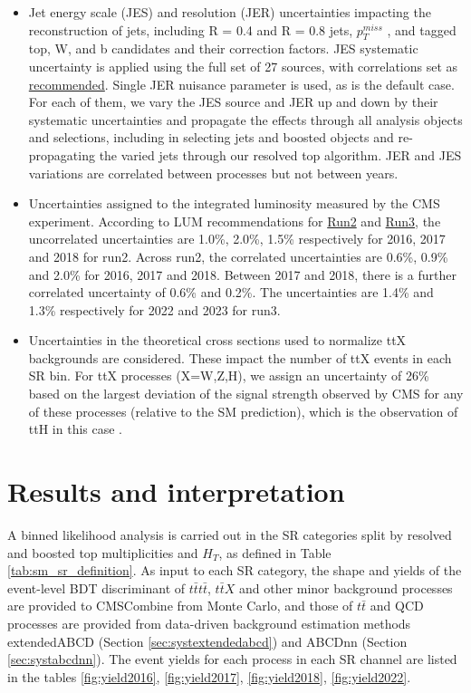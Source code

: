 \documentclass[twoside]{article}
\begin{document}
\begin{itemize}
    \item Jet energy scale (JES) and resolution (JER) uncertainties impacting the reconstruction of jets, including R = 0.4 and R = 0.8 jets, $p_T^{miss}$ , and tagged top, W, and b candidates and their correction factors. JES systematic uncertainty is applied using the full set of 27 sources, with correlations set as \href{https://cms-jerc.web.cern.ch/Recommendations/#uncertainites-and-correlations}{recommended}. Single JER nuisance parameter is used, as is the default case. For each of them, we vary the JES source and JER up and down by their systematic uncertainties and propagate the effects through all analysis objects and selections, including in selecting jets and boosted objects and re-propagating the varied jets through our resolved top algorithm. JER and JES variations are correlated between processes but not between years.
    \item Uncertainties assigned to the integrated luminosity measured by the CMS experiment. According to LUM recommendations for \href{https://twiki.cern.ch/twiki/bin/view/CMS/LumiRecommendationsRun2#Combination_and_correlations}{Run2} and \href{https://twiki.cern.ch/twiki/bin/view/CMS/LumiRecommendationsRun3}{Run3}, the uncorrelated uncertainties are 1.0\%, 2.0\%, 1.5\% respectively for 2016, 2017 and 2018 for run2. Across run2, the correlated uncertainties are 0.6\%, 0.9\% and 2.0\% for 2016, 2017 and 2018. Between 2017 and 2018, there is a further correlated uncertainty of 0.6\% and 0.2\%. The uncertainties are 1.4\% and 1.3\% respectively for 2022 and 2023 for run3. 
    \item Uncertainties in the theoretical cross sections used to normalize ttX backgrounds are considered. These impact the number of ttX events in each SR bin. For ttX processes (X=W,Z,H), we assign an uncertainty of 26\% based on the largest deviation of the signal strength observed by CMS for any of these processes (relative to the SM prediction), which is the observation of ttH in this case \cite{tth}.
    
\end{itemize}
\clearpage
\section{Results and interpretation}
A binned likelihood analysis is carried out in the SR categories split by resolved and boosted top multiplicities and $H_T$, as defined in Table \ref{tab:sm_sr_definition}. As input to each SR category, the shape and yields of the event-level BDT discriminant of $t\bar{t}t\bar{t}$, $t\bar{t}X$ and other minor background processes are provided to CMSCombine from Monte Carlo, and those of $t\bar{t}$ and QCD processes are provided from data-driven background estimation methods extendedABCD (Section \ref{sec:systextendedabcd}) and ABCDnn (Section \ref{sec:systabcdnn}). The event yields for each process in each SR channel are listed in the tables \ref{fig:yield2016}, \ref{fig:yield2017}, \ref{fig:yield2018}, \ref{fig:yield2022}. \\
\end{document}
